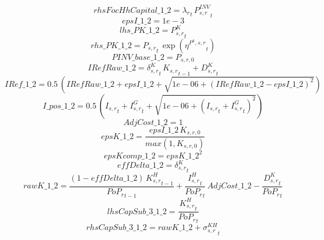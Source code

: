 \begin{dmath*}
rhsFocHhCapital\_1\_2 = {\lambda_r}_{t}\, {{P^{INV}_{s,r}}}_{t}
\end{dmath*}
\begin{dmath*}
epsI\_1\_2 = 1e-3
\end{dmath*}
\begin{dmath*}
lhs\_PK\_1\_2 = {{P^K_{s,r}}}_{t}
\end{dmath*}
\begin{dmath*}
rhs\_PK\_1\_2 = {{P_{s,r}}}_{t}\, \exp\left({{\eta^{P^k,s,r}}}_{t}\right)
\end{dmath*}
\begin{dmath*}
PINV\_base\_1\_2 = {{P_{s,r,0}}}
\end{dmath*}
\begin{dmath*}
IRefRaw\_1\_2 = {{\delta^{K}_{s,r}}}_{t}\, {{K_{s,r}}}_{t-1}+{{D^K_{s,r}}}_{t}
\end{dmath*}
\begin{dmath*}
IRef\_1\_2 = 0.5\, \left({IRefRaw\_1\_2}+{epsI\_1\_2}+\sqrt{1e-06+\left({IRefRaw\_1\_2}-{epsI\_1\_2}\right)^{2}}\right)
\end{dmath*}
\begin{dmath*}
I\_pos\_1\_2 = 0.5\, \left({{I_{s,r}}}_{t}+{{I^G_{s,r}}}_{t}+\sqrt{1e-06+\left({{I_{s,r}}}_{t}+{{I^G_{s,r}}}_{t}\right)^{2}}\right)
\end{dmath*}
\begin{dmath*}
AdjCost\_1\_2 = 1
\end{dmath*}
\begin{dmath*}
epsK\_1\_2 = \frac{{epsI\_1\_2}\, {{K_{s,r,0}}}}{max(1,{{K_{s,r,0}}})}
\end{dmath*}
\begin{dmath*}
epsKcomp\_1\_2 = {epsK\_1\_2}^{2}
\end{dmath*}
\begin{dmath*}
effDelta\_1\_2 = {{\delta^{K}_{s,r}}}_{t}
\end{dmath*}
\begin{dmath*}
rawK\_1\_2 = \frac{\left(1-{effDelta\_1\_2}\right)\, {{K^H_{s,r}}}_{t-1}}{{{PoP_r}}_{t-1}}+\frac{{{I^H_{s,r}}}_{t}}{{{PoP_r}}_{t}}\, {AdjCost\_1\_2}-\frac{{{D^K_{s,r}}}_{t}}{{{PoP_r}}_{t}}
\end{dmath*}
\begin{dmath*}
lhsCapSub\_3\_1\_2 = \frac{{{K^H_{s,r}}}_{t}}{{{PoP_r}}_{t}}
\end{dmath*}
\begin{dmath*}
rhsCapSub\_3\_1\_2 = {rawK\_1\_2}+{{\sigma^{KH}_{s,r}}}_{t}
\end{dmath*}
